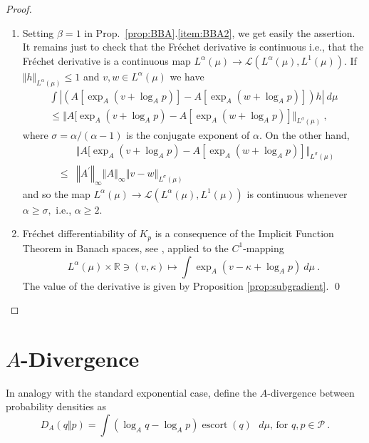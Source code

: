 \documentclass[graybox]{svmult}
\newcommand{\escortof}[1]{\operatorname{escort}\left(#1\right)}
\begin{document}
\begin{proof}
\begin{enumerate}
\item Setting $\beta =1$ in Prop.~\ref{prop:BBA}.\ref{item:BBA2}, we
get easily the assertion. It remains just to check that the Fr\'{e}chet
derivative is continuous i.e., that the Fr\'echet derivative is a continuous
map $L^{\alpha }(\mu )\rightarrow \mathcal{L}(L^{\alpha }(\mu ),L^{1}(\mu ))$. If $\Vert {h}\Vert _{L^{\alpha }(\mu )}\leq 1$ and $v,w\in L^{\alpha }(\mu
)$ we have 
\begin{multline*}
\int \left\vert {(A[\exp _{A}(v+\log _{A}p)]-A[\exp _{A}(w+\log _{A}p)])h}
\right\vert \ d\mu \\
\leq \Vert {A[\exp _{A}(v+\log _{A}p)-A[\exp _{A}(w+\log _{A}p)]}\Vert
_{L^{\sigma }(\mu )}\ ,
\end{multline*}
where $\sigma =\alpha /\left( \alpha -1\right) $ is the conjugate exponent of $
\alpha $. On the other hand,
\begin{eqnarray*}
&&\Vert {A[\exp _{A}(v+\log _{A}p)-A[\exp _{A}(w+\log _{A}p)]}\Vert
_{L^{\sigma }(\mu )} \\
&\leq &\left\Vert A^{\prime }\right\Vert _{\infty }\left\Vert A\right\Vert
_{\infty }\left\Vert v-w\right\Vert _{L^{\sigma }(\mu )}
\end{eqnarray*}
and so the map $L^{\alpha }(\mu )\rightarrow \mathcal{L}(L^{\alpha }(\mu
),L^{1}(\mu ))$ is continuous whenever $\alpha \geq \sigma ,$ i.e., $\alpha
\geq 2$.

\item Fr\'echet differentiability of $K_{p}$ is a consequence of the
Implicit Function Theorem in Banach spaces, see \cite{dieudonne:60}, applied
to the $C^{1}$-mapping 
\begin{equation*}
L^{\alpha }(\mu )\times \mathbb{R}\ni (v,\kappa )\mapsto \int \exp
_{A}(v-\kappa +\log _{A}p)\ d\mu \ .
\end{equation*}
The value of the derivative is given by Proposition \ref{prop:subgradient}. \qed
\end{enumerate}
\end{proof}

\section{$A$-Divergence}
\label{sec:convex-conjugate}
%
In analogy with the standard exponential case, define the $A$-divergence between
probability densities as
\begin{equation*}
D_{A}(q\Vert p)=\int \left( \log _{A}q-\log _{A}p\right) \escortof{q}\text{ }
d\mu \text{, \ for }q,p\in \mathcal{P} \ .
\end{equation*}
\end{document}
